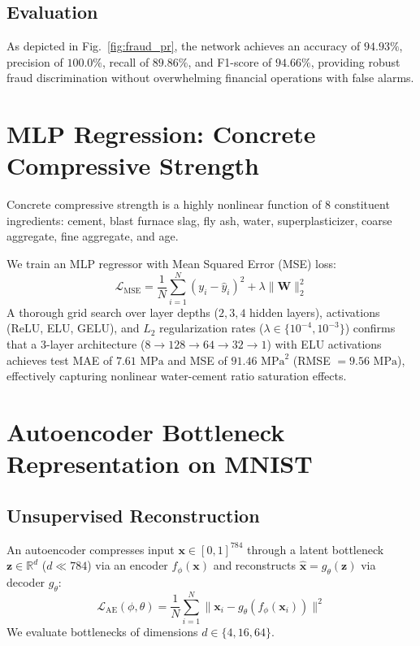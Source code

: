 \documentclass[conference]{IEEEtran}
\begin{document}
\subsection{Evaluation}
As depicted in Fig.~\ref{fig:fraud_pr}, the network achieves an accuracy of $94.93\%$, precision of $100.0\%$, recall of $89.86\%$, and F1-score of $94.66\%$, providing robust fraud discrimination without overwhelming financial operations with false alarms.

\section{MLP Regression: Concrete Compressive Strength}
Concrete compressive strength is a highly nonlinear function of 8 constituent ingredients: cement, blast furnace slag, fly ash, water, superplasticizer, coarse aggregate, fine aggregate, and age.

We train an MLP regressor with Mean Squared Error (MSE) loss:
\begin{equation}
\mathcal{L}_{\text{MSE}} = \frac{1}{N} \sum_{i=1}^N (y_i - \hat{y}_i)^2 + \lambda \|\mathbf{W}\|_2^2
\end{equation}
A thorough grid search over layer depths ($2, 3, 4$ hidden layers), activations (ReLU, ELU, GELU), and $L_2$ regularization rates ($\lambda \in \{10^{-4}, 10^{-3}\}$) confirms that a 3-layer architecture ($8 \to 128 \to 64 \to 32 \to 1$) with ELU activations achieves test MAE of $7.61\text{ MPa}$ and MSE of $91.46\text{ MPa}^2$ (RMSE $= 9.56\text{ MPa}$), effectively capturing nonlinear water-cement ratio saturation effects.

\section{Autoencoder Bottleneck Representation on MNIST}
\subsection{Unsupervised Reconstruction}
An autoencoder compresses input $\mathbf{x} \in [0, 1]^{784}$ through a latent bottleneck $\mathbf{z} \in \mathbb{R}^d$ ($d \ll 784$) via an encoder $f_{\phi}(\mathbf{x})$ and reconstructs $\mathbf{\hat{x}} = g_{\theta}(\mathbf{z})$ via decoder $g_{\theta}$:
\begin{equation}
\mathcal{L}_{\text{AE}}(\phi, \theta) = \frac{1}{N} \sum_{i=1}^N \|\mathbf{x}_i - g_{\theta}(f_{\phi}(\mathbf{x}_i))\|^2
\end{equation}
We evaluate bottlenecks of dimensions $d \in \{4, 16, 64\}$.
\end{document}
